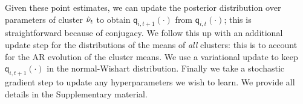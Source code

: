 Given these point estimates, we can update the posterior distribution over parameters of cluster $\hat{\nu}_t$ to obtain $\mathsf{q}_{i,t+1}(\cdot)$ from 
$\mathsf{q}_{i,t}(\cdot)$; this is straightforward because of conjugacy. We follow this up with an additional update step for the distributions of the means of
\emph{all} clusters: this is to account for the AR evolution of the cluster means. 
We use a variational update to keep  $\mathsf{q}_{i,t+1}(\cdot)$ in the normal-Wishart distribution. Finally we take a stochastic gradient step to
update any hyperparameters we wish to learn. We provide all details in the Supplementary material.


